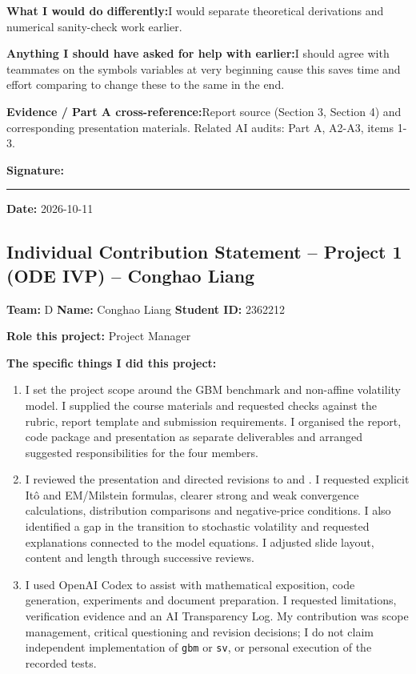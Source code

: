 \textbf{What I would do differently:}\newline I would separate theoretical derivations and numerical sanity-check work earlier.

\textbf{Anything I should have asked for help with earlier:}\newline I should agree with teammates on the symbols variables at very beginning cause this saves time and effort comparing to change these to the same in the end.

\textbf{Evidence / Part A cross-reference:}\newline Report source  (Section 3, Section 4) and corresponding presentation materials. Related AI audits: Part A, A2-A3, items 1-3.

\vspace{8mm}\textbf{Signature:} \rule{5cm}{.3pt} \qquad \textbf{Date:} 2026-10-11
\clearpage
\subsection*{Individual Contribution Statement -- Project 1 (ODE IVP) -- Conghao Liang}
\textbf{Team:} D \quad \textbf{Name:} Conghao Liang \quad \textbf{Student ID:} 2362212

\textbf{Role this project:} Project Manager

\textbf{The specific things I did this project:}
\begin{enumerate}[leftmargin=*]
\item I set the project scope around the GBM benchmark and non-affine volatility model. I supplied the course materials and requested checks against the rubric, report template and submission requirements. I organised the report, code package and presentation as separate deliverables and arranged suggested responsibilities for the four members.
\item I reviewed the presentation and directed revisions to  and . I requested explicit It\^o and EM/Milstein formulas, clearer strong and weak convergence calculations, distribution comparisons and negative-price conditions. I also identified a gap in the transition to stochastic volatility and requested explanations connected to the model equations. I adjusted slide layout, content and length through successive reviews.
\item I used OpenAI Codex to assist with mathematical exposition, code generation, experiments and document preparation. I requested limitations, verification evidence and an AI Transparency Log. My contribution was scope management, critical questioning and revision decisions; I do not claim independent implementation of \texttt{gbm} or \texttt{sv}, or personal execution of the recorded tests.
\end{enumerate}

